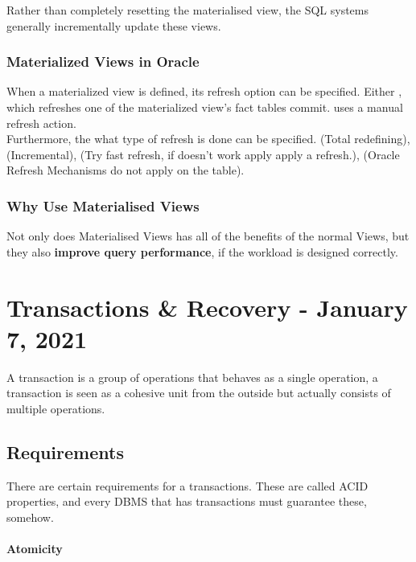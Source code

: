 \documentclass[11pt,a4paper,twocolumn]{book}
\begin{document}
Rather than completely resetting the materialised view, the SQL systems generally incrementally update these views.\\

\subsection{Materialized Views in Oracle}

When a materialized view is defined, its refresh option can be specified. Either , which refreshes one of the materialized view's fact tables commit.  uses a manual refresh action.\\

Furthermore, the what type of refresh is done can be specified.  (Total redefining),  (Incremental),  (Try fast refresh, if doesn't work apply apply a  refresh.),  (Oracle Refresh Mechanisms do not apply on the table).

\subsection{Why Use Materialised Views}

Not only does Materialised Views has all of the benefits of the normal Views, but they also \textbf{improve query performance}, if the workload is designed correctly.

\chapter{Transactions \& Recovery - January 7, 2021}

A transaction is a group of operations that behaves as a single operation, a transaction is seen as a cohesive unit from the outside but actually consists of multiple operations. \\

\section{Requirements}

There are certain requirements for a transactions. These are called ACID properties, and every DBMS that has transactions must guarantee these, somehow.

\subsubsection{Atomicity}
\end{document}
